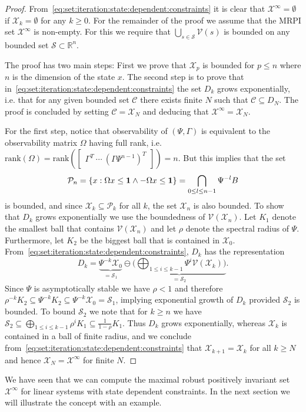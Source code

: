 \documentclass[journal]{IEEEtran}
\theoremstyle{remark}
\theoremstyle{definition}
\begin{document}
\begin{proof}
From~\eqref{eq:set:iteration:state:dependent:constraints} it is clear that $\mathcal X^\infty = \emptyset$ 
if $\mathcal X_k =\emptyset$ for any $k\geq 0$. For the remainder of the proof we assume that the MRPI set 
$\mathcal X^\infty$ is non-empty. For this we require that $\bigcup_{s\in\mathcal S}\mathcal V(s)$ is 
bounded on any bounded set $\mathcal S\subset\mathbb R^n$.

The proof has two main steps: First we prove that $\mathcal X_p$ is bounded for $p\leq n$
where $n$ is the dimension of the state $x$. The second step is to prove that in~\eqref{eq:set:iteration:state:dependent:constraints}
the set $D_k$ grows exponentially, i.e. that for any given bounded set $\mathcal C$ there exists
finite $N$ such that $\mathcal C\subseteq D_{N}$. The proof is concluded by setting 
$\mathcal C = \mathcal X_{N}$ and deducing that $\mathcal X^\infty = \mathcal X_N$. 

For the first step, notice that observability of $(\Psi,\Gamma)$ is equivalent to the observability matrix 
$\Omega$ having full rank, i.e.\ $\mathrm{rank}(\Omega) = \mathrm{rank}(\begin{bmatrix} \Gamma^T \ \cdots \ 
(\Gamma\Psi^{n-1})^T\end{bmatrix}) = n$.
But  this implies that the set 
%
\[
\mathcal P_{n} = \{x: 
\Omega x\leq{\bf{1}}\wedge-\Omega x\leq{\bf{1}}\} = \bigcap_{0\leq l\leq n-1} \Psi^{-l} B
\]
%
is bounded, and since $\mathcal X_k\subseteq \mathcal P_k$ for all $k$, 
the set $\mathcal X_{n}$ is also bounded. To show that $D_k$ grows exponentially we use the boundedness 
of $\mathcal V(\mathcal X_{n})$. Let $K_1$ denote the smallest ball that contains $\mathcal V(\mathcal X_{n})$ and let
$\rho$ denote the spectral radius of $\Psi$. Furthermore, let $K_2$
be the biggest ball that is contained in $\mathcal X_{0}$. From~\eqref{eq:set:iteration:state:dependent:constraints}, 
$D_k$ has the representation
%
\begin{equation}
D_k = \underbrace{\Psi^{-k}\mathcal X_0}_{=\mathcal S_1} \ominus \underbrace{\biggl(\bigoplus_{1\leq i\leq k-1} 
\Psi^i\mathcal V(\mathcal X_k)\biggr)}_{=\mathcal S_2}.
\end{equation}
%
Since $\Psi$ is asymptotically stable we have $\rho<1$ and therefore $\rho^{-k}K_2\subseteq\Psi^{-k} K_2 
\subseteq \Psi^{-k}\mathcal X_0 = \mathcal S_1$, implying exponential growth of $D_k$ provided $\mathcal S_2$ 
is bounded. To bound $\mathcal S_2$ we note that for $k\geq n$ we have $\mathcal S_2\subseteq 
\bigoplus_{1\leq i\leq k-1} \rho^i K_1 \subseteq \frac{1}{1-\rho} K_1$. Thus $D_k$ grows exponentially, whereas 
$\mathcal X_k$ is contained in a ball of finite radius, and we conclude from~\eqref{eq:set:iteration:state:dependent:constraints} that 
$\mathcal X_{k+1} = \mathcal X _k$ for all $k\geq N$ and hence $\mathcal X _N = \mathcal X^\infty$ for finite $N$.
\end{proof}
%
We have seen that we can compute the maximal robust positively invariant set $\mathcal X^\infty$ for linear 
systems with state dependent constraints. In the next section we will illustrate the concept with an 
example.
\end{document}
